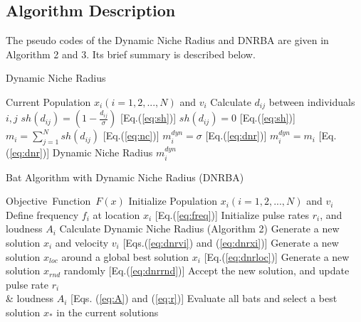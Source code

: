\subsection{Algorithm Description}
The pseudo codes of the Dynamic Niche Radius and DNRBA are given in Algorithm 2 and 3. Its brief summary is described below.
\begin{algorithm}[t]
\caption{Dynamic Niche Radius}
\label{code:dnr}
\begin{algorithmic}[2]
\REQUIRE Current Population $x_i(i=1,2,..., N)$ and $v_i$
\STATE Calculate $d_{ij}$ between individuals $i,j$
\STATE $sh(d_{ij}) =  (1-\frac{d_{ij}}{\sigma})$ [Eq.(\ref{eq:sh})]
\ELSE
\STATE $sh(d_{ij}) =  0 $ [Eq.(\ref{eq:sh})]
\ENDIF
\ENDFOR
\STATE $m_i=\sum_{j=1}^N sh(d_{ij})$ [Eq.(\ref{eq:nc})]
\ENDFOR
{}
\STATE $m_i^{dyn}=\sigma$ [Eq.(\ref{eq:dnr})]
\ELSE 
\STATE $m_i^{dyn} = m_i$ [Eq.(\ref{eq:dnr})]
\ENDIF
\ENDFOR
\RETURN Dynamic Niche Radius $m_i^{dyn}$

\end{algorithmic}
\end{algorithm}


\begin{algorithm}[t]
\caption{Bat Algorithm with Dynamic Niche Radius (DNRBA)}
\label{code:dnrba}
\begin{algorithmic}[3]
\REQUIRE Objective\ Function\ $F(x)$
\STATE Initialize Population $x_i(i=1,2,..., N)$ and $v_i$\\
\STATE Define frequency $f_i$ at location $x_i$ [Eq.(\ref{eq:freq})]
\STATE Initialize pulse rates $r_i$, and loudness $A_i$
\STATE Calculate Dynamic Niche Radius (Algorithm 2)
\STATE Generate a new solution $x_i$ and velocity $v_i$ [Eqs.(\ref{eq:dnrvi}) and (\ref{eq:dnrxi})]
\STATE Generate a new solution $x_{loc}$ around a global best solution $x_i$ [Eq.(\ref{eq:dnrloc})] 
\ENDIF
\STATE Generate a new solution $x_{rnd}$ randomly [Eq.(\ref{eq:dnrrnd})]
\STATE Accept the new solution, and update pulse rate $r_i$ \\ \& loudness $A_i$ [Eqs. (\ref{eq:A}) and (\ref{eq:r})]  
\ENDIF
\STATE Evaluate all bats and select a best solution $x_*$ in the current solutions
\ENDFOR
\ENDWHILE
\end{algorithmic}
\end{algorithm}

